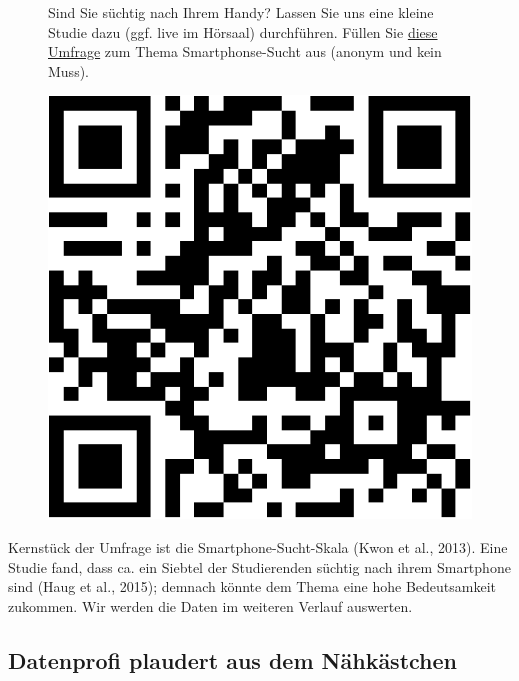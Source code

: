 \documentclass[
  letterpaper,
]{scrbook}
\theoremstyle{definition}
\theoremstyle{definition}
\theoremstyle{definition}
\theoremstyle{remark}
\begin{document}
\begin{figure}

\begin{minipage}{0.80\linewidth}
Sind Sie süchtig nach Ihrem Handy? Lassen Sie uns eine kleine Studie
dazu (ggf. live im Hörsaal) durchführen. Füllen Sie
\href{https://forms.gle/PP8yb6Ubqq3JU78F9}{diese Umfrage} zum Thema
Smartphonse-Sucht aus (anonym und kein Muss).\end{minipage}%
%
\begin{minipage}{0.20\linewidth}

\begin{center}
\includegraphics[width=0.75\linewidth,height=\textheight,keepaspectratio]{010-rahmen_files/figure-pdf/qr-google-forms-handysucht-1.pdf}
\end{center}

\end{minipage}%

\end{figure}%

Kernstück der Umfrage ist die Smartphone-Sucht-Skala (Kwon et al.,
2013). Eine Studie fand, dass ca. ein Siebtel der Studierenden süchtig
nach ihrem Smartphone sind (Haug et al., 2015); demnach könnte dem Thema
eine hohe Bedeutsamkeit zukommen. Wir werden die Daten im weiteren
Verlauf auswerten.

\subsection{Datenprofi plaudert aus dem
Nähkästchen}\label{datenprofi-plaudert-aus-dem-nuxe4hkuxe4stchen}
\end{document}
